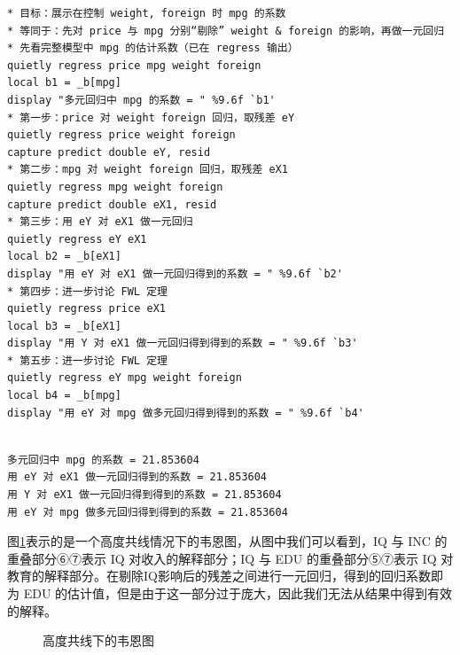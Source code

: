 \begin{tcolorbox}[title=在 Stata 中展示FWL定理, colback=white, colframe=black, colbacktitle=white, coltitle=black,fonttitle=\bfseries]
	\begin{lstlisting}[xleftmargin=2em, commentstyle=\color{black}]
* 目标：展示在控制 weight, foreign 时 mpg 的系数
* 等同于：先对 price 与 mpg 分别“剔除” weight & foreign 的影响，再做一元回归
* 先看完整模型中 mpg 的估计系数（已在 regress 输出）
quietly regress price mpg weight foreign
local b1 = _b[mpg]
display "多元回归中 mpg 的系数 = " %9.6f `b1'
* 第一步：price 对 weight foreign 回归，取残差 eY
quietly regress price weight foreign
capture predict double eY, resid
* 第二步：mpg 对 weight foreign 回归，取残差 eX1
quietly regress mpg weight foreign
capture predict double eX1, resid
* 第三步：用 eY 对 eX1 做一元回归
quietly regress eY eX1
local b2 = _b[eX1]
display "用 eY 对 eX1 做一元回归得到的系数 = " %9.6f `b2'
* 第四步：进一步讨论 FWL 定理
quietly regress price eX1
local b3 = _b[eX1]
display "用 Y 对 eX1 做一元回归得到得到的系数 = " %9.6f `b3'
* 第五步：进一步讨论 FWL 定理
quietly regress eY mpg weight foreign
local b4 = _b[mpg]
display "用 eY 对 mpg 做多元回归得到得到的系数 = " %9.6f `b4'
	\end{lstlisting}
	\vspace{-2em}
	\begin{Verbatim}[commandchars=\\\{\},xleftmargin=2em]

多元回归中 mpg 的系数 = 21.853604
用 eY 对 eX1 做一元回归得到的系数 = 21.853604
用 Y 对 eX1 做一元回归得到得到的系数 = 21.853604
用 eY 对 mpg 做多元回归得到得到的系数 = 21.853604
	\end{Verbatim}

\end{tcolorbox}

图\ref{fig:venncol}表示的是一个高度共线情况下的韦恩图，从图中我们可以看到，IQ 与 INC 的重叠部分⑥⑦表示 IQ 对收入的解释部分；IQ 与 EDU 的重叠部分⑤⑦表示 IQ 对教育的解释部分。在剔除IQ影响后的残差之间进行一元回归，得到的回归系数即为 EDU 的估计值，但是由于这一部分过于庞大，因此我们无法从结果中得到有效的解释。

\begin{figure}[ht]
	\centering
	\caption{高度共线下的韦恩图}
	\label{fig:venncol}
\end{figure}

